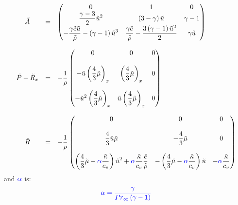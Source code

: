 \documentclass[11pt, a4paper]{article}
\begin{document}
\begin{equation}
    \begin{array}{ccl}
        \tilde{A} & = & \begin{pmatrix}
            0 & 1 & 0 \\
            \displaystyle\frac{\gamma-3}{2}\tilde{u}^2 & \left(3-\gamma\right)\tilde{u} & \gamma-1 \\
            \displaystyle-\frac{\gamma\tilde{e}\tilde{u}}{\tilde{\rho}}-\left(\gamma-1\right)\tilde{u}^3 & \displaystyle\frac{\gamma\tilde{e}}{\tilde{\rho}}-\frac{3\left(\gamma-1\right)\tilde{u}^2}{2} & \gamma\tilde{u}
        \end{pmatrix} \\\\
        \tilde{P}-\tilde{R}_x & = & \displaystyle-\frac{1}{\rho}\begin{pmatrix}
            0 & 0 & 0 \\\\
            \displaystyle-\tilde{u}\left(\frac{4}{3}\tilde{\mu}\right)_x & \displaystyle\left(\frac{4}{3}\tilde{\mu}\right)_x & 0 \\\\
            \displaystyle-\tilde{u}^2\left(\frac{4}{3}\tilde{\mu}\right)_x & \displaystyle\tilde{u}\left(\frac{4}{3}\tilde{\mu}\right)_x & 0
        \end{pmatrix} \\\\
        \tilde{R} & = & \displaystyle-\frac{1}{\rho}\begin{pmatrix}
            0 & 0 & 0 \\\\
            \displaystyle\frac{4}{3}\tilde{u}\tilde{\mu} & \displaystyle-\frac{4}{3}\tilde{\mu} & 0 \\\\
            \displaystyle\left(\frac{4}{3}\tilde{\mu}-\textcolor{blue}{\alpha}\frac{\tilde{\kappa}}{c_v}\right)\tilde{u}^2+\textcolor{blue}{\alpha}\frac{\tilde{\kappa}}{c_v}\frac{\tilde{e}}{\tilde{\rho}} & \displaystyle-\left(\frac{4}{3}\tilde{\mu}-\textcolor{blue}{\alpha}\frac{\tilde{\kappa}}{c_v}\right)\tilde{u} & \displaystyle-\textcolor{blue}{\alpha}\frac{\tilde{\kappa}}{c_v}
        \end{pmatrix}
    \end{array}
\end{equation}
and $\textcolor{blue}{\alpha}$ is: $$\textcolor{blue}{\alpha=\frac{\gamma}{Pr_\infty\left(\gamma-1\right)}}$$
\end{document}
